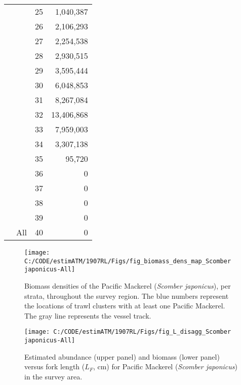 \documentclass[]{article}
\begin{document}
\begin{longtable}{>{\em}l|l|r|r}
\cline{3-4}
\rowcolor{gray!6}   &  & 25 & 1,040,387\\
\cline{3-4}
 &  & 26 & 2,106,293\\
\cline{3-4}
\rowcolor{gray!6}   &  & 27 & 2,254,538\\
\cline{3-4}
 &  & 28 & 2,930,515\\
\cline{3-4}
\rowcolor{gray!6}   &  & 29 & 3,595,444\\
\cline{3-4}
 &  & 30 & 6,048,853\\
\cline{3-4}
\rowcolor{gray!6}   &  & 31 & 8,267,084\\
\cline{3-4}
 &  & 32 & 13,406,868\\
\cline{3-4}
\rowcolor{gray!6}   &  & 33 & 7,959,003\\
\cline{3-4}
 &  & 34 & 3,307,138\\
\cline{3-4}
\rowcolor{gray!6}   &  & 35 & 95,720\\
\cline{3-4}
 &  & 36 & 0\\
\cline{3-4}
\rowcolor{gray!6}   &  & 37 & 0\\
\cline{3-4}
 &  & 38 & 0\\
\cline{3-4}
\rowcolor{gray!6}   &  & 39 & 0\\
\cline{3-4}
\multirow{-40}{*}{\raggedright\arraybackslash Scomber japonicus} & \multirow{-40}{*}{\raggedright\arraybackslash All} & 40 & 0\\
\hline
\end{longtable}



\begin{figure}[H]

{\centering \texttt{[image: C:/CODE/estimATM/1907RL/Figs/fig\_biomass\_dens\_map\_Scomber japonicus-All]} 

}

\caption{Biomass densities of the Pacific Mackerel (\emph{Scomber japonicus}), per strata, throughout the survey region. The blue numbers represent the locations of trawl clusters with at least one Pacific Mackerel. The gray line represents the vessel track.}\label{fig:biom-dens-mack}
\end{figure}

\newpage



\begin{figure}[H]

{\centering \texttt{[image: C:/CODE/estimATM/1907RL/Figs/fig\_L\_disagg\_Scomber japonicus-All]} 

}

\caption{Estimated abundance (upper panel) and biomass (lower panel) versus fork length (\(L_F\), cm) for Pacific Mackerel (\emph{Scomber japonicus}) in the survey area.}\label{fig:l-disagg-mack}
\end{figure}
\end{document}
